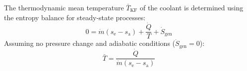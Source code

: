 The thermodynamic mean temperature \( \bar{T}_{\text{KF}} \) of the coolant is determined using the entropy balance for steady-state processes:  
\[
0 = \dot{m} (s_{\text{e}} - s_{\text{a}}) + \frac{\dot{Q}}{T} + \dot{S}_{\text{gen}}
\]  
Assuming no pressure change and adiabatic conditions (\( \dot{S}_{\text{gen}} = 0 \)):  
\[
\bar{T} = \frac{\dot{Q}}{\dot{m} (s_{\text{e}} - s_{\text{a}})}
\]